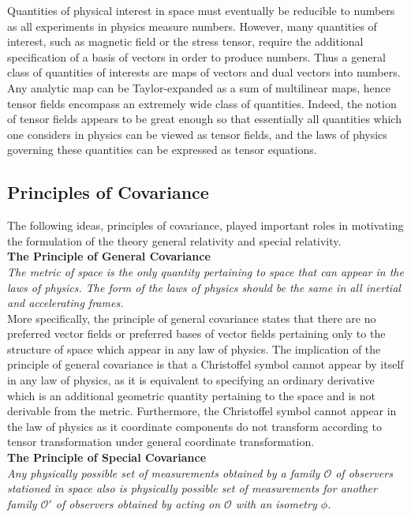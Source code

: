 \documentclass[11pt, onesided]{book}
\theoremstyle{break}
\theoremstyle{break}
\begin{document}
Quantities of physical interest in space must eventually be reducible to numbers as all experiments in physics measure numbers. However, many quantities of interest, such as magnetic field or the stress tensor, require the additional specification of a basis of vectors in order to produce numbers. Thus a general class of quantities of interests are maps of vectors and dual vectors into numbers. Any analytic map can be Taylor-expanded as a sum of multilinear maps, hence tensor fields encompass an extremely wide class of quantities. Indeed, the notion of tensor fields appears to be great enough so that essentially all quantities which one considers in physics can be viewed as tensor fields, and the laws of physics governing these quantities can be expressed as tensor equations. \\

\subsection{Principles of Covariance}
The following ideas, principles of covariance, played important roles in motivating the formulation of the theory general relativity and special relativity. \\

\textbf{The Principle of General Covariance}\\
\textit{The metric of space is the only quantity pertaining to space that can appear in the laws of physics. The form of the laws of physics should be the same in all inertial and accelerating frames.}\\

More specifically, the principle of general covariance states that there are no preferred vector fields or preferred bases of vector fields pertaining only to the structure of space which appear in any law of physics. The implication of the principle of general covariance is that a Christoffel symbol cannot appear by itself in any law of physics, as it is equivalent to specifying an ordinary derivative which is an additional geometric quantity pertaining to the space and is not derivable from the metric. Furthermore, the Christoffel symbol cannot appear in the law of physics as it coordinate components do not transform according to tensor transformation under general coordinate transformation. \\

\textbf{The Principle of Special Covariance}\\
\textit{Any physically possible set of measurements obtained by a family $\mathcal{O}$ of observers stationed in space also is physically possible set of measurements for another family $\mathcal{O}'$ of observers obtained by acting on $\mathcal{O}$ with an isometry $\phi$.}\\
\end{document}
